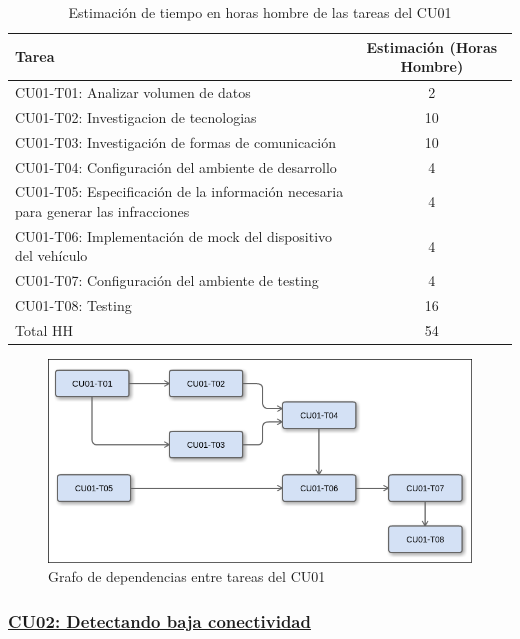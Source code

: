 \begin{table}[htb]
\begin{center}
\begin{tabular}{|l|c|}
\hline
Tarea & Estimación (Horas Hombre) \\
\hline \hline
CU01-T01: Analizar volumen de datos & 2 \\ \hline
CU01-T02: Investigacion de tecnologias & 10 \\ \hline
CU01-T03: Investigación de formas de comunicación & 10 \\ \hline
CU01-T04: Configuración del ambiente de desarrollo & 4 \\ \hline
CU01-T05: Especificación de la información necesaria para generar las infracciones & 4 \\ \hline
CU01-T06: Implementación de mock del dispositivo del vehículo & 4 \\ \hline
CU01-T07: Configuración del ambiente de testing & 4 \\ \hline
CU01-T08: Testing & 16 \\ \hline \hline
Total HH & 54 \\ \hline
\end{tabular}
\caption{Estimación de tiempo en horas hombre de las tareas del CU01}
\end{center}
\end{table}


\begin{figure}
  \centering
    \includegraphics[width=1\textwidth]{./imagenes/dependenciasCU01.png}
  \caption{Grafo de dependencias entre tareas del CU01}
\end{figure}


\subsubsection{\underline{CU02: Detectando baja conectividad}}

